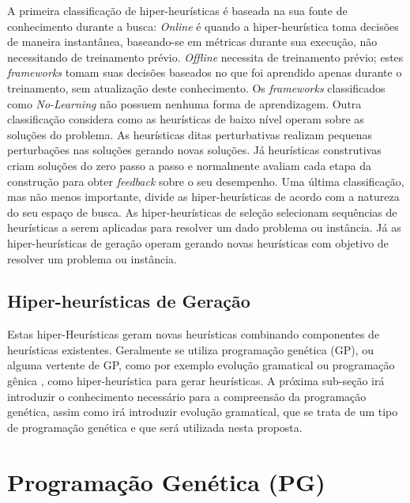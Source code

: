 A primeira classificação de hiper-heurísticas é baseada na sua fonte de conhecimento durante a busca: \textit{Online} é quando a hiper-heurística toma decisões de maneira instantânea, baseando-se em métricas durante sua execução, não necessitando de treinamento prévio. \textit{Offline} necessita de treinamento prévio; estes \textit{frameworks}  tomam suas decisões baseados no que foi aprendido apenas durante o treinamento, sem atualização deste conhecimento. Os \textit{frameworks} classificados como \textit{No-Learning} não possuem nenhuma forma de aprendizagem. Outra classificação considera como as heurísticas de baixo nível operam sobre as soluções do problema. As heurísticas ditas perturbativas realizam pequenas perturbações nas soluções gerando novas soluções. Já heurísticas construtivas criam soluções do zero passo a passo e normalmente avaliam cada etapa da construção para obter \textit{feedback} sobre o seu desempenho. Uma última  classificação, mas não menos importante, divide as hiper-heurísticas de acordo com a  natureza do seu espaço de busca. As hiper-heurísticas de seleção selecionam sequências de heurísticas a serem aplicadas para resolver um dado problema ou instância. Já as hiper-heurísticas de geração operam gerando novas heurísticas com objetivo de resolver um problema ou instância.


\subsection{Hiper-heurísticas de Geração}
\label{Hiper-Heuristicas-Geraçao}

Estas hiper-Heurísticas geram novas heurísticas combinando componentes de heurísticas existentes. Geralmente se utiliza programação genética (GP), ou alguma vertente de GP, como por exemplo evolução gramatical \cite{ryan1998grammatical} ou programação gênica \cite{ferreira2006gene}, como hiper-heurística para gerar heurísticas. A próxima sub-seção irá introduzir o conhecimento necessário para a compreensão da programação genética, assim como irá introduzir evolução gramatical, que se trata de um tipo de programação genética e que será utilizada nesta proposta.

\section{Programação Genética (PG)}
\label{subsection:PG}

